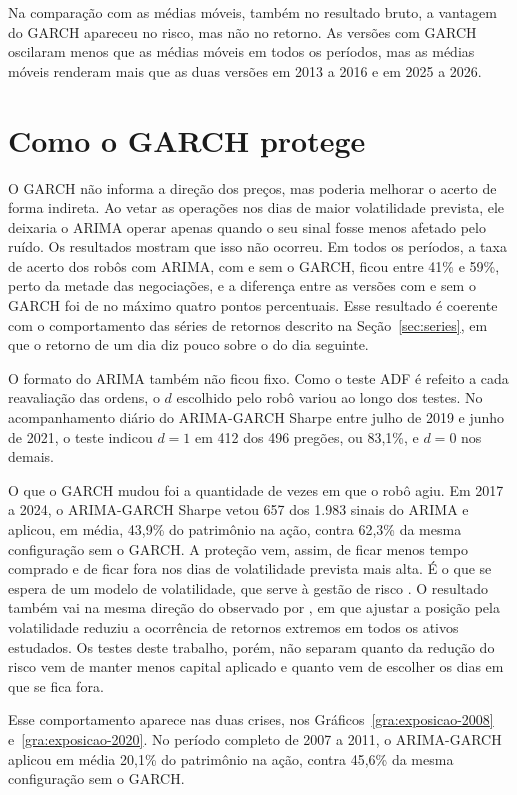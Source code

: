 Na comparação com as médias móveis, também no resultado bruto, a vantagem do GARCH
apareceu no risco, mas não no retorno. As versões com GARCH oscilaram menos que as
médias móveis em todos os períodos, mas as médias móveis renderam mais que as duas
versões em 2013 a 2016 e em 2025 a 2026.

\section{Como o GARCH protege}
\label{sec:mecanismo}

O GARCH não informa a direção dos preços, mas poderia melhorar o acerto de forma
indireta. Ao vetar as operações nos dias de maior volatilidade prevista, ele
deixaria o ARIMA operar apenas quando o seu sinal fosse menos afetado pelo ruído.
Os resultados mostram que isso não ocorreu. Em todos os períodos, a taxa de acerto
dos robôs com ARIMA, com e sem o GARCH, ficou entre 41\% e 59\%, perto da metade
das negociações, e a diferença entre as versões com e sem o GARCH foi de no máximo
quatro pontos percentuais. Esse resultado é coerente
com o comportamento das séries de retornos descrito na Seção~\ref{sec:series}, em
que o retorno de um dia diz pouco sobre o do dia seguinte.

O formato do ARIMA também não ficou fixo. Como o teste ADF é refeito a cada
reavaliação das ordens, o $d$ escolhido pelo robô variou ao longo dos testes. No
acompanhamento diário do ARIMA-GARCH Sharpe entre julho de 2019 e junho de 2021, o teste
indicou $d = 1$ em 412 dos 496 pregões, ou 83,1\%, e $d = 0$ nos demais.

O que o GARCH mudou foi a quantidade de vezes em que o robô agiu. Em 2017 a 2024,
o ARIMA-GARCH Sharpe vetou 657 dos 1.983 sinais do ARIMA e aplicou, em média, 43,9\% do
patrimônio na ação, contra 62,3\% da mesma configuração sem o GARCH. A proteção vem,
assim, de ficar menos tempo comprado e de ficar fora nos dias de volatilidade
prevista mais alta. É o que se espera de um modelo de volatilidade, que serve à
gestão de risco \cite{araya2024}. O resultado também vai na mesma direção do
observado por , em que ajustar a posição pela volatilidade
reduziu a ocorrência de retornos extremos em todos os ativos estudados. Os testes
deste trabalho, porém, não separam quanto da redução do risco vem de manter menos
capital aplicado e quanto vem de escolher os dias em que se fica fora.

Esse comportamento aparece nas duas crises, nos Gráficos~\ref{gra:exposicao-2008}
e~\ref{gra:exposicao-2020}. No período completo de 2007 a 2011, o ARIMA-GARCH
aplicou em média 20,1\% do patrimônio na ação, contra 45,6\% da mesma configuração
sem o GARCH.

